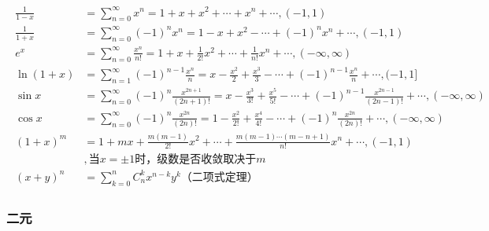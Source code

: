 \documentclass[12pt]{book}
\begin{document}
\begin{gather*}
    \begin{aligned}
        \frac{1}{1-x} & = \sum_{n=0}^{\infty}{x^n} = 1 + x + x^2 + \cdots + x^n + \cdots , (-1,1)                                                                                           \\
        \frac{1}{1+x} & = \sum_{n=0}^{\infty}{(-1)^{n}x^{n}} = 1 - x + x^2 - \cdots + (-1)^{n}x^{n} + \cdots , (-1,1)                                                                       \\
        e^x           & = \sum_{n=0}^{\infty}{\frac{x^n}{n!}} = 1 + x + \frac{1}{2!}x^2 + \cdots + \frac{1}{n!}x^n + \cdots , (-\infty,\infty)                                              \\
        \ln{(1+x)}    & = \sum_{n=1}^{\infty}{(-1)^{n-1}\frac{x^{n}}{n} } = x - \frac{x^2}{2} + \frac{x^3}{3} - \cdots +(-1)^{n-1}\frac{x^{n}}{n}+\cdots ,(-1,1]                              \\
        \sin{x}       & = \sum_{n=0}^{\infty}{(-1)^{n}\frac{x^{2n+1}}{(2n+1)!} }= x - \frac{x^3}{3!} + \frac{x^5}{5!} - \cdots +(-1)^{n-1}\frac{x^{2n-1}}{(2n-1)!}+\cdots ,(-\infty,\infty) \\
        \cos{x}       & = \sum_{n=0}^{\infty}{(-1)^{n}\frac{x^{2n}}{(2n)!} }= 1 - \frac{x^2}{2!} + \frac{x^4}{4!} - \cdots +(-1)^{n}\frac{x^{2n}}{(2n)!}+\cdots ,(-\infty,\infty)           \\
        (1+x)^{m}     & = 1+mx+\frac{m(m-1)}{2!}x^{2}+\cdots+\frac{m(m-1)\cdots (m-n+1)}{n!}x^{n}+\cdots, (-1,1)                                                                            \\
                      & ,\text{当}x=\pm 1\text{时，级数是否收敛取决于}m                                                                                                                     \\
        (x+y)^{n}     & =\sum_{k=0}^{n}{C_{n}^{k} x^{n-k} y^{k}} \text{（二项式定理）}
    \end{aligned}
\end{gather*}


\subsubsection{二元}
\end{document}
